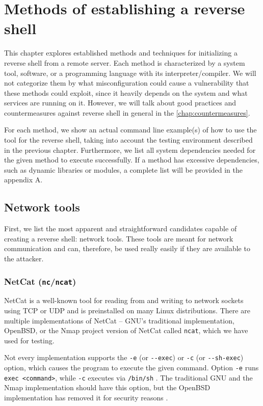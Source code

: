 \chapter{Methods of establishing a reverse shell}
\label{chap:methods}

This chapter explores established methods and techniques for initializing a reverse shell from a remote server. Each method is characterized by a system tool, software, or a programming language with its interpreter/compiler. We will not categorize them by what misconfiguration could cause a vulnerability that these methods could exploit, since it heavily depends on the system and what services are running on it. However, we will talk about good practices and countermeasures against reverse shell in general in the \cref{chap:countermeasures}.

For each method, we show an actual command line example(s) of how to use the tool for the reverse shell, taking into account the testing environment described in the previous chapter. Furthermore, we list all system dependencies needed for the given method to execute successfully. If a method has excessive dependencies, such as dynamic libraries or modules, a complete list will be provided in the appendix A.


\section{Network tools}

First, we list the most apparent and straightforward candidates capable of creating a reverse shell: network tools. These tools are meant for network communication and can, therefore, be used really easily if they are available to the attacker.


\subsection{NetCat (\texttt{nc}/\texttt{ncat})}


NetCat is a well-known tool for reading from and writing to network sockets using TCP or UDP and is preinstalled on many Linux distributions. There are multiple implementations of NetCat -- GNU's traditional implementation, OpenBSD, or the Nmap project version of NetCat called \texttt{ncat}, which we have used for testing.

Not every implementation supports the \texttt{-e} (or \texttt{-{}-exec}) or \texttt{-c} (or \texttt{-{}-sh-exec}) option, which causes the program to execute the given command. Option \texttt{-e} runs \texttt{exec <command>}, while \texttt{-c} executes via \texttt{/bin/sh} \cite{ncat-man}. The traditional GNU and the Nmap implementation should have this option, but the OpenBSD implementation has removed it for security reasons \cite{nc-man}.

